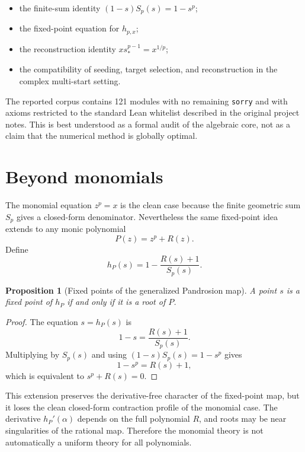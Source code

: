 \documentclass[11pt,a4paper]{article}
\theoremstyle{plain}
\newtheorem{proposition}[theorem]{Proposition}
\theoremstyle{definition}
\theoremstyle{remark}
\newcommand{\Sp}{S_p}
\newcommand{\hp}{h_{p,x}}
\begin{document}
\begin{itemize}
  \item the finite-sum identity $(1-s)\Sp(s)=1-s^p$;
  \item the fixed-point equation for $\hp$;
  \item the reconstruction identity $x s_*^{p-1}=x^{1/p}$;
  \item the compatibility of seeding, target selection, and reconstruction in
  the complex multi-start setting.
\end{itemize}

The reported corpus contains 121 modules with no remaining \texttt{sorry} and
with axioms restricted to the standard Lean whitelist described in the original
project notes.  This is best understood as a formal audit of the algebraic
core, not as a claim that the numerical method is globally optimal.

\section{Beyond monomials}
\label{sec:general-polynomials}

The monomial equation $z^p=x$ is the clean case because the finite geometric
sum $\Sp$ gives a closed-form denominator.  Nevertheless the same fixed-point
idea extends to any monic polynomial
\[
  P(z)=z^p+R(z).
\]
Define
\begin{equation}
  h_P(s)=1-\frac{R(s)+1}{\Sp(s)}.
  \label{eq:general-hp}
\end{equation}

\begin{proposition}[Fixed points of the generalized Pandrosion map]
A point $s$ is a fixed point of $h_P$ if and only if it is a root of $P$.
\end{proposition}

\begin{proof}
The equation $s=h_P(s)$ is
\[
  1-s=\frac{R(s)+1}{\Sp(s)}.
\]
Multiplying by $\Sp(s)$ and using $(1-s)\Sp(s)=1-s^p$ gives
\[
  1-s^p=R(s)+1,
\]
which is equivalent to $s^p+R(s)=0$.
\end{proof}

This extension preserves the derivative-free character of the fixed-point map,
but it loses the clean closed-form contraction profile of the monomial case.
The derivative $h_P'(\alpha)$ depends on the full polynomial $R$, and roots may
be near singularities of the rational map.  Therefore the monomial theory is
not automatically a uniform theory for all polynomials.
\end{document}
